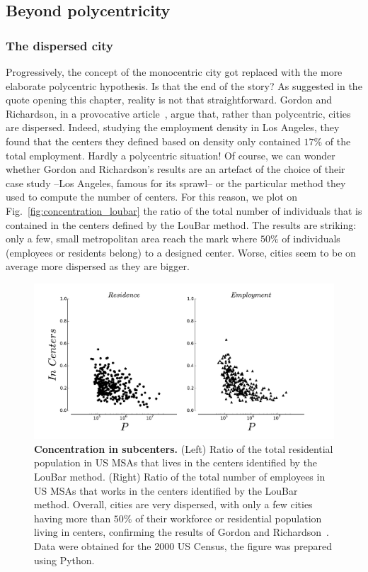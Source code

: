 \subsection{Beyond polycentricity}
\label{sec:beyond_polycentricity}


\subsubsection{The dispersed city}
\label{sub:the_dispersed_city}

Progressively, the concept of the monocentric city got replaced with the more
elaborate polycentric hypothesis. Is that the end of the story? As suggested in
the quote opening this chapter, reality is not that straightforward. Gordon and
Richardson, in a provocative article~\cite{Gordon:1996}, argue that, rather than
polycentric, cities are dispersed. Indeed, studying the employment density in
Los Angeles, they found that the centers they defined based on density only contained $17\%$ of
the total employment. Hardly a polycentric situation! 
Of course, we can wonder whether Gordon and Richardson's results are an artefact
of the choice of their case study --Los Angeles, famous for its sprawl-- or the particular method they
used to compute the number of centers. For this reason, we plot on
Fig.~\ref{fig:concentration_loubar} the ratio of the total number of individuals that is contained
in the centers defined by the LouBar method. The results are striking: only a
few, small metropolitan area reach the mark where $50\%$ of individuals
(employees or residents belong) to a designed center. Worse, cities seem to be
on average more dispersed as they are bigger.\\

\begin{figure}
    \centering
    \includegraphics[width=1\textwidth]{gfx/chapter-monocentric/concentration_loubar.pdf}
    \caption{{\bf Concentration in subcenters.} (Left) Ratio of the total
    residential population in US MSAs that lives in the centers identified by the LouBar
method. (Right) Ratio of the total number of employees in US MSAs that works in the centers
identified by the LouBar method. Overall, cities are very dispersed, with only a
few cities having more than $50\%$ of their workforce or residential population
living in centers, confirming the results of Gordon and
Richardson~\cite{Gordon:1996}. Data were obtained for the 2000 US Census, the
figure was prepared using Python.\label{fig:concentation_loubar}}
\end{figure}

